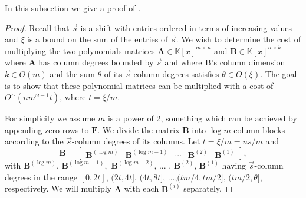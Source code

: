 In this subsection we give a proof of .
\begin{proof}
Recall that $\vec{s}$ is a shift with entries ordered in terms of
increasing values and $\xi$ is a bound on the sum of the entries
of $\vec{s}$. We wish to determine the cost of multiplying the two
polynomials matrices $\mathbf{A}\in\mathbb{K}\left[x\right]^{m\times n}$
and $\mathbf{B}\in\mathbb{K}\left[x\right]^{n\times k}$ where $\mathbf{A}$
has column degrees bounded by $\vec{s}$ and where $\mathbf{B}$'s
column dimension $k\in O\left(m\right)$ and the sum $\theta$ of
its $\vec{s}$-column degrees satisfies $\theta\in O\left(\xi\right)$.
The goal is to show that these polynomial matrices can be multiplied
with a cost of $O^{\sim}(nm^{\omega-1}t)$, where $t=\xi/m$.

For simplicity we assume $m$ is a power of $2$, something which
can be achieved by appending zero rows to $\mathbf{F}$. We divide
the matrix $\mathbf{B}$ into $\log m$ column blocks according to
the $\vec{s}$-column degrees of its columns. Let $t=\xi/m=ns/m$
and 
\[
\mathbf{B}=\left[\begin{array}{ccccc}
\mathbf{B}^{\left(\log m\right)} & \mathbf{B}^{\left(\log m-1\right)} & \cdots & \mathbf{B}^{\left(2\right)} & \mathbf{B}^{\left(1\right)}\end{array}\right],
\]
 with $\mathbf{B}^{\left(\log m\right)}$, $\mathbf{B}^{\left(\log m-1\right)},$
$\mathbf{B}^{\left(\log m-2\right)}$, ... , $\mathbf{B}^{\left(2\right)}$,
$\mathbf{B}^{\left(1\right)}$ having $\vec{s}$-column degrees in
the range $\left[0,2t\right]$, $(2t,4t]$, $(4t,8t]$, ...,$(tm/4,tm/2]$,
$(tm/2,\theta]$, respectively. We will multiply $\mathbf{A}$ with
each $\mathbf{B}^{\left(i\right)}$ separately.


\end{proof}
